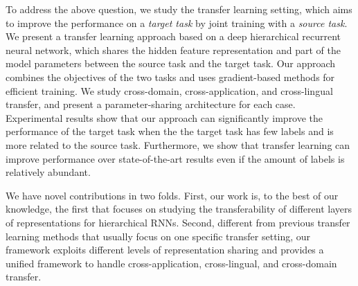 To address the above question, we study the transfer learning setting, which aims to improve the performance on a \textit{target task} by joint training with a \textit{source task}. We present a transfer learning approach based on a deep hierarchical recurrent neural network, which shares the hidden feature representation and part of the model parameters between the source task and the target task. Our approach combines the objectives of the two tasks and uses gradient-based methods for efficient training.
We study cross-domain, cross-application, and cross-lingual transfer, and present a parameter-sharing architecture for each case.
Experimental results show that our approach can significantly improve the performance of the target task when the the target task has few labels and is more related to the source task. Furthermore, we show that transfer learning can improve performance over state-of-the-art results even if the amount of labels is relatively abundant.

We have novel contributions in two folds. First, our work is, to the best of our knowledge, the first that focuses on studying the transferability of different layers of representations for hierarchical RNNs. Second, different from previous transfer learning methods that usually focus on one specific transfer setting, our framework exploits different levels of representation sharing and provides a unified framework to handle cross-application, cross-lingual, and cross-domain transfer.

